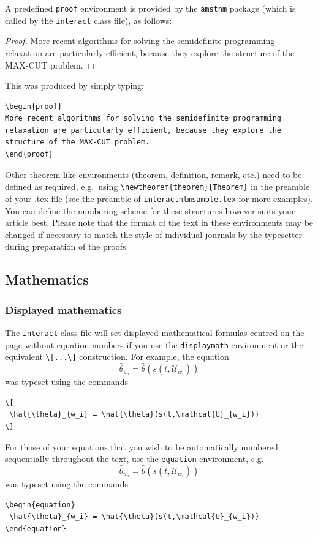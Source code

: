 \documentclass[]{interact}
\theoremstyle{plain}%
\theoremstyle{definition}
\theoremstyle{remark}
\begin{document}
A predefined \verb"proof" environment is provided by the \texttt{amsthm} package (which is called by the \texttt{interact} class file), as follows:
\begin{proof}
More recent algorithms for solving the semidefinite programming relaxation are particularly efficient, because they explore the structure of the MAX-CUT problem.
\end{proof}
\noindent This was produced by simply typing:
\begin{verbatim}
\begin{proof}
More recent algorithms for solving the semidefinite programming
relaxation are particularly efficient, because they explore the
structure of the MAX-CUT problem.
\end{proof}
\end{verbatim}
Other theorem-like environments (theorem, definition, remark, etc.) need to be defined as required, e.g.\ using \verb"\newtheorem{theorem}{Theorem}" in the preamble of your .tex file (see the preamble of \verb"interactnlmsample.tex" for more examples). You can define the numbering scheme for these structures however suits your article best. Please note that the format of the text in these environments may be changed if necessary to match the style of individual journals by the typesetter during preparation of the proofs.


\subsection{Mathematics}

\subsubsection{Displayed mathematics}

The \texttt{interact} class file will set displayed mathematical formulas centred on the page without equation numbers if you use the \texttt{displaymath} environment or the equivalent \verb"\[...\]" construction. For example, the equation
\[
 \hat{\theta}_{w_i} = \hat{\theta}(s(t,\mathcal{U}_{w_i}))
\]
was typeset using the commands
\begin{verbatim}
\[
 \hat{\theta}_{w_i} = \hat{\theta}(s(t,\mathcal{U}_{w_i}))
\]
\end{verbatim}

For those of your equations that you wish to be automatically numbered sequentially throughout the text, use the \texttt{equation} environment, e.g.
\begin{equation}
 \hat{\theta}_{w_i} = \hat{\theta}(s(t,\mathcal{U}_{w_i}))
\end{equation}
was typeset using the commands
\begin{verbatim}
\begin{equation}
 \hat{\theta}_{w_i} = \hat{\theta}(s(t,\mathcal{U}_{w_i}))
\end{equation}
\end{verbatim}
\end{document}
